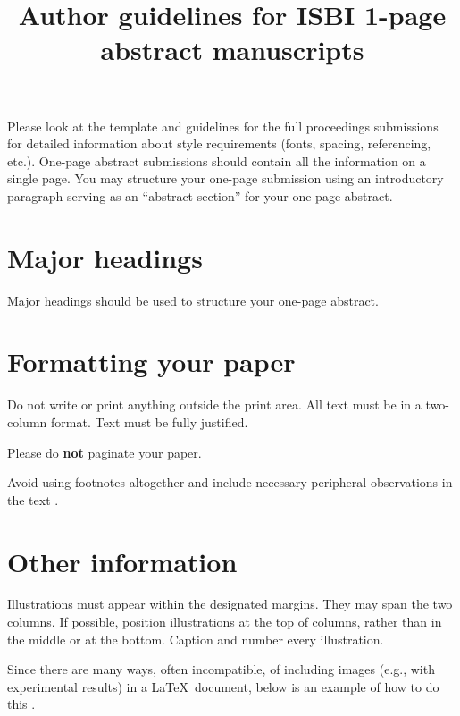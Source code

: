 \documentclass{article}
\title{Author guidelines for ISBI 1-page abstract manuscripts}
\begin{document}
%
\maketitle

Please look at the template and guidelines for the full proceedings submissions
for detailed information about style requirements (fonts, spacing, referencing,
etc.). One-page abstract submissions should contain all the information on a
single page. You may structure your one-page submission using an introductory
paragraph serving as an “abstract section” for your one-page abstract.



\section{Major headings}
%
Major headings should be used to structure your one-page abstract.


\section{Formatting your paper}
%
Do not write or print anything outside the print area. All text must be in a
two-column format. Text must be fully justified.

Please do \textbf{not} paginate your paper.

Avoid using footnotes altogether and include necessary peripheral observations
in the text .


\section{Other information}
%
Illustrations must appear within the designated margins.  They may span the two
columns.  If possible, position illustrations at the top of columns, rather than in
the middle or at the bottom.  Caption and number every illustration.

Since there are many ways, often incompatible, of including images (e.g., with
experimental results) in a \LaTeX\ document, below is an example of how to do
this \cite{Lamp86}.
\end{document}
